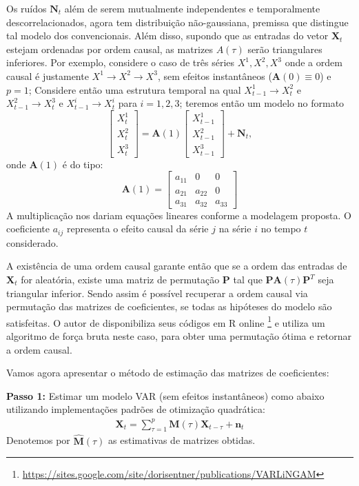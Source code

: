 \documentclass[12pt,letterpaper]{article}
\newcommand{\bd}[1]{\boldsymbol{#1}}
\begin{document}
	Os ruídos $\bd N_t$ além de serem mutualmente independentes e temporalmente descorrelacionados, agora tem distribuição não-gaussiana, premissa que distingue tal modelo dos convencionais. Além disso, supondo que as entradas do vetor $\bd X_t$ estejam ordenadas por ordem causal, as matrizes $A(\tau)$ serão triangulares inferiores. Por exemplo, considere o caso de três séries $X^1,X^2,X^3$ onde a ordem causal é justamente $X^1\to X^2\to X^3$, sem efeitos instantâneos ($\bd A(0)\equiv0$) e $p=1$; Considere então uma estrutura temporal na qual $X^1_{t-1}\to X^2_{t}$ e $X^2_{t-1}\to X^3_{t}$ e $X^i_{t-1}\to X^i_{t}$ para $i=1,2,3$; teremos então um modelo no formato
	$$\begin{bmatrix}X^1_t\\X^2_t\\X^3_t\end{bmatrix}=\bd A(1) \begin{bmatrix}X^1_{t-1}\\X^2_{t-1}\\X^3_{t-1}\end{bmatrix}+\bd N_t,$$
	onde $\bd A(1)$ é do tipo:
	$$\bd A(1)=\begin{bmatrix}
		a_{11} & 0 & 0\\
		a_{21} & a_{22} & 0\\
		a_{31} & a_{32} & a_{33}
	\end{bmatrix}$$
	 A multiplicação nos dariam equações lineares conforme a modelagem proposta. O coeficiente $a_{ij}$ representa o efeito causal da série $j$ na série $i$ no tempo $t$ considerado.
	 
	 A existência de uma ordem causal garante então que se a ordem das entradas de $\bd X_t$ for aleatória, existe uma matriz de permutação $\bd P$ tal que $\bd P \bd A(\tau) \bd P^T$ seja triangular inferior. Sendo assim é possível recuperar a ordem causal via permutação das matrizes de coeficientes, se todas as hipóteses do modelo são satisfeitas. O autor de \cite{tsling2} disponibiliza seus códigos em R online \footnote{\href{https://sites.google.com/site/dorisentner/publications/VARLiNGAM}{https://sites.google.com/site/dorisentner/publications/VARLiNGAM}} e utiliza um algoritmo de força bruta neste caso, para obter uma permutação ótima e retornar a ordem causal.
	 
	 Vamos agora apresentar o método de estimação das matrizes de coeficientes:
	 
	 \textbf{Passo 1:} Estimar um modelo VAR (sem efeitos instantâneos) como abaixo utilizando implementações padrões de otimização quadrática:
	 \begin{align}\label{p1}\displaystyle \bd X_t=\sum_{\tau=1}^{p}\bd M(\tau)\bd X_{t-\tau}+\bd n_t\end{align}
	Denotemos por $\hat{\bd M}(\tau)$ as estimativas de matrizes obtidas.
	
\end{document}
